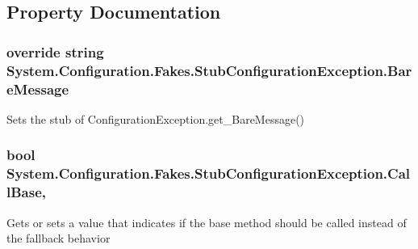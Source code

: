 \subsection{Property Documentation}
\hypertarget{class_system_1_1_configuration_1_1_fakes_1_1_stub_configuration_exception_a4c843762f68c5d35ed485c96055a8f01}{
\subsubsection[{Bare\-Message}]{\setlength{\rightskip}{0pt plus 5cm}override string System.\-Configuration.\-Fakes.\-Stub\-Configuration\-Exception.\-Bare\-Message\hspace{0.3cm}{\ttfamily [get]}}}\label{class_system_1_1_configuration_1_1_fakes_1_1_stub_configuration_exception_a4c843762f68c5d35ed485c96055a8f01}


Sets the stub of Configuration\-Exception.\-get\-\_\-\-Bare\-Message()

\hypertarget{class_system_1_1_configuration_1_1_fakes_1_1_stub_configuration_exception_abce600dc9c168004ddef207119e1f9e5}{
\subsubsection[{Call\-Base}]{\setlength{\rightskip}{0pt plus 5cm}bool System.\-Configuration.\-Fakes.\-Stub\-Configuration\-Exception.\-Call\-Base\hspace{0.3cm}{\ttfamily [get]}, {\ttfamily [set]}}}\label{class_system_1_1_configuration_1_1_fakes_1_1_stub_configuration_exception_abce600dc9c168004ddef207119e1f9e5}


Gets or sets a value that indicates if the base method should be called instead of the fallback behavior

